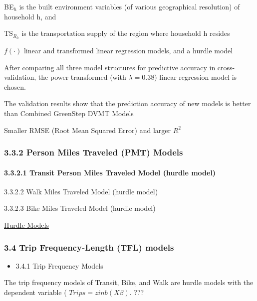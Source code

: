 \documentclass[
]{article}
\providecommand{\tightlist}{%
  \setlength{\itemsep}{0pt}\setlength{\parskip}{0pt}}
\begin{document}
BE\(_h\) is the built environment variables (of various geographical
resolution) of household h, and

TS\(_{R_h}\) is the transportation supply of the region where household
h resides

\(f(\cdot)\) linear and transformed linear regression models, and a
hurdle model

After comparing all three model structures for predictive accuracy in
cross-validation, the power transformed (with \(\lambda=0.38\)) linear
regression model is chosen.

The validation results show that the prediction accuracy of new models
is better than Combined GreenStep DVMT Models

Smaller RMSE (Root Mean Squared Error) and larger \(R^2\)

\hypertarget{person-miles-traveled-pmt-models}{%
\subsubsection{3.3.2 Person Miles Traveled (PMT)
Models}\label{person-miles-traveled-pmt-models}}

\hypertarget{transit-person-miles-traveled-model-hurdle-model}{%
\paragraph{3.3.2.1 Transit Person Miles Traveled Model (hurdle
model)}\label{transit-person-miles-traveled-model-hurdle-model}}

3.3.2.2 Walk Miles Traveled Model (hurdle model)

3.3.2.3 Bike Miles Traveled Model (hurdle model)

\href{https://data.library.virginia.edu/getting-started-with-hurdle-models/}{Hurdle
Models}

\hypertarget{trip-frequency-length-tfl-models}{%
\subsubsection{3.4 Trip Frequency-Length (TFL)
models}\label{trip-frequency-length-tfl-models}}

\begin{itemize}
\tightlist
\item
  3.4.1 Trip Frequency Models
\end{itemize}

The trip frequency models of Transit, Bike, and Walk are hurdle models
with the dependent variable ( \(Trips=zinb(X\beta)\). {???}
\end{document}
